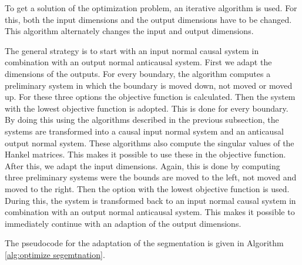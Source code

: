 \documentclass[doctype=mastersthesis,BCOR=15mm,biblatex]{ldvbook}%
\begin{document}
To get a solution of the optimization problem, an iterative algorithm is used.
For this, both the input dimensions and the output dimensions have to be changed.
This algorithm alternately changes the input and output dimensions.

The general strategy is to start with an input normal causal system in combination with an output normal anticausal system.
First we adapt the dimensions of the outputs.
For every boundary, the algorithm computes a preliminary system in which the boundary is moved down, not moved or moved up.
For these three options the objective function is calculated. 
Then the system with the lowest objective function is adopted.
This is done for every boundary.
By doing this using the algorithms described in the previous subsection, the systems are transformed into a causal input normal system and an anticausal output normal system.
These algorithms also compute the singular values of the Hankel matrices. This makes it possible to use these in the objective function.
After this, we adapt the input dimensions.
Again, this is done by computing three preliminary systems were the 
  bounds are moved to the left, not moved and moved to the right.
Then the option with the lowest objective function is used.
During this, the system is transformed back to an input normal causal system in combination with an output normal anticausal system.
This makes it possible to immediately continue with an adaption of the output dimensions.

The pseudocode for the adaptation of the segmentation is given in Algorithm\,\ref{alg:optimize segemtnation}.
\end{document}
